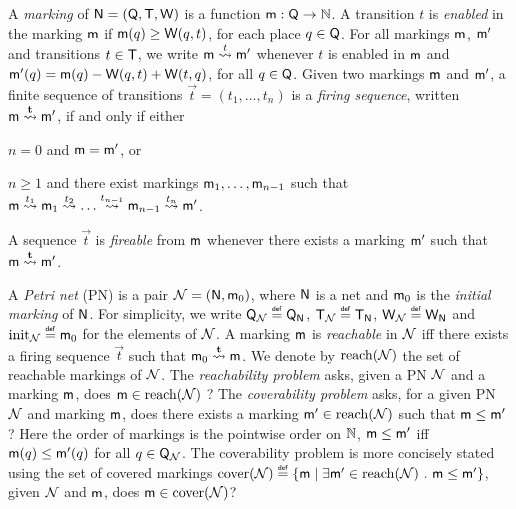 A \emph{marking} of $\mathsf{N} = (\mathsf{Q},\mathsf{T},\mathsf{W})$ is a function
$\mathsf{m} : \mathsf{Q} \rightarrow \mathbb{N}$. A transition $t$ is
\emph{enabled} in the marking $\mathsf{m}$ if $\mathsf{m}(q) \geq
\mathsf{W}(q,t)$, for each place $q \in \mathsf{Q}$. For all markings
$\mathsf{m}$, $\mathsf{m}'$ and transitions $t \in \mathsf{T}$, we write $\mathsf{m}
\stackrel{t}{\leadsto} \mathsf{m}'$ whenever $t$ is enabled in $\mathsf{m}$ and $\mathsf{m}'(q)
= \mathsf{m}(q) - \mathsf{W}(q,t) + \mathsf{W}(t,q)$, for all $q \in
\mathsf{Q}$. Given two markings $\mathsf{m}$ and $\mathsf{m}'$, a finite sequence
of transitions $\vec{t} = (t_1, \ldots,t_n)$ is a \emph{firing
  sequence}, written $\mathsf{m} \stackrel{\mathbf{t}}{\leadsto} \mathsf{m}'$, if and only if
either \begin{inparaenum}[(i)]
\item $n=0$ and $\mathsf{m}=\mathsf{m}'$, or
%
\item $n\geq1$ and there exist markings $\mathsf{m}_1, \ldots,
  \mathsf{m}_{n-1}$ such that $\mathsf{m} \stackrel{t_1}{\leadsto} \mathsf{m}_1 \stackrel{t_2}{\leadsto} \ldots
  \stackrel{t_{n-1}}{\leadsto} \mathsf{m}_{n-1} \stackrel{t_n}{\leadsto} \mathsf{m}'$.
\end{inparaenum}
A sequence $\vec{t}$ is \emph{fireable} from $\mathsf{m}$ whenever there
exists a marking $\mathsf{m}'$ such that $\mathsf{m} \stackrel{\mathbf{t}}{\leadsto} \mathsf{m}'$.

A \emph{Petri net} (PN) is a pair $\mathcal{N}=(\mathsf{N},\mathsf{m}_0)$,
where $\mathsf{N}$ is a net and $\mathsf{m}_0$ is the \emph{initial marking} of
$\mathsf{N}$. For simplicity, we write $\mathsf{Q}_{\mathcal{N}} \stackrel{\scriptscriptstyle{\mathsf{def}}}{=}
\mathsf{Q}_{\mathsf{N}}$, $\mathsf{T}_{\mathcal{N}} \stackrel{\scriptscriptstyle{\mathsf{def}}}{=} \mathsf{T}_{\mathsf{N}}$,
$\mathsf{W}_{\mathcal{N}} \stackrel{\scriptscriptstyle{\mathsf{def}}}{=} \mathsf{W}_{\mathsf{N}}$ and
$\mathrm{init}_{\mathcal{N}}\stackrel{\scriptscriptstyle{\mathsf{def}}}{=}\mathsf{m}_0$ for the elements of
$\mathcal{N}$. A marking $\mathsf{m}$ is \emph{reachable} in $\mathcal{N}$
iff there exists a firing sequence $\vec{t}$ such that $\mathsf{m}_0
\stackrel{\mathbf{t}}{\leadsto} \mathsf{m}$. We denote by $\mathrm{reach}({\mathcal{N}})$ the set of
reachable markings of $\mathcal{N}$. The \emph{reachability problem}
asks, given a PN $\mathcal{N}$ and a marking $\mathsf{m}$, does
$\mathsf{m}\in\mathrm{reach}({\mathcal{N}})$ ? The \emph{coverability problem} asks,
for a given PN $\mathcal{N}$ and marking $\mathsf{m}$, does there exists a
marking $\mathsf{m}' \in \mathrm{reach}({\mathcal{N}})$ such that $\mathsf{m} \leq
\mathsf{m}'$? Here the order of markings is the pointwise order on $\mathbb{N}$,
\ie $\mathsf{m} \leq \mathsf{m}'$ iff $\mathsf{m}(q) \leq \mathsf{m}'(q)$ for all $q
\in \mathsf{Q}_{\mathcal{N}}$. The coverability problem is more concisely
stated using the set of covered markings $\mathrm{cover}({\mathcal{N}}) \stackrel{\scriptscriptstyle{\mathsf{def}}}{=}
\{\mathsf{m} \mid \exists \mathsf{m}'\in\mathrm{reach}({\mathcal{N}}) ~.~ \mathsf{m} \leq
\mathsf{m}'\}$, \ie given $\mathcal{N}$ and $\mathsf{m}$, does
$\mathsf{m}\in\mathrm{cover}({\mathcal{N}})$?

